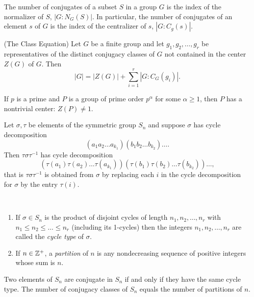 \documentclass[../main]{subfiles}
\begin{document}
 
 \begin{prop}
  The number of conjugates of a subset $S$ in a group $G$ is the index of the normalizer of $S$, $|G:N_G(S)|$. In particular, the number of conjugates of an element $s$ of $G$ is the index of the centralizer of $s$, $|G:C_g(s)|$.
 \end{prop}
 
 
 \begin{thm}
  (The Class Equation) Let $G$ be a finite group and let $g_1,g_2, \ldots ,g_r$ be representatives of the distinct conjugacy classes of $G$ not contained in the center $Z(G)$ of $G$. Then 
  \[|G| = |Z(G)| + \sum_{i=1}^r |G:C_G(g_i)|.\]
 \end{thm}
 
 
 \begin{thm}
  If $p$ is a prime and $P$ is a group of prime order $p^\alpha$ for some $\alpha \geq 1$, then $P$ has a nontrivial center: $Z(P) \neq 1$.
 \end{thm}
 
 
 \begin{prop}
  Let $\sigma,\tau$ be elements of the symmetric group $S_n$ and suppose $\sigma$ has cycle decomposition 
  \[(a_1a_2 \ldots a_{k_1})(b_1 b_2 \ldots b_{k_2})\ldots.\]
  Then $\tau \sigma \tau^{-1}$ has cycle decomposition
  \[(\tau(a_1) \tau(a_2) \ldots \tau(a_{k_1})) (\tau(b_1) \tau(b_2) \ldots \tau(b_{k_2})) \ldots,\]
  that is $\tau \sigma \tau^{-1}$ is obtained from $\sigma$ by replacing each $i$ in the cycle decomposition for $\sigma$ by the entry $\tau(i)$.
 \end{prop}
 
 
 \begin{dfn}
  ~\begin{enumerate}
    \item If $\sigma \in S_n$ is the product of disjoint cycles of length $n_1, n_2, \ldots , n_r$ with $n_1 \leq n_2 \leq \ldots \leq n_r$ (including its 1-cycles) then the integers $n_1, n_2, \ldots , n_r$ are called the \textit{cycle type} of $\sigma$.
    \item If $n \in \mathbb{Z}^+$, a \textit{partition} of $n$ is any nondecreasing sequence of positive integers whose sum is $n$.
   \end{enumerate}
 \end{dfn}
 
 
 \begin{prop}
  Two elements of $S_n$ are conjugate in $S_n$ if and only if they have the same cycle type. The number of conjugacy classes of $S_n$ equals the number of partitions of $n$.
 \end{prop}
 
\end{document}
